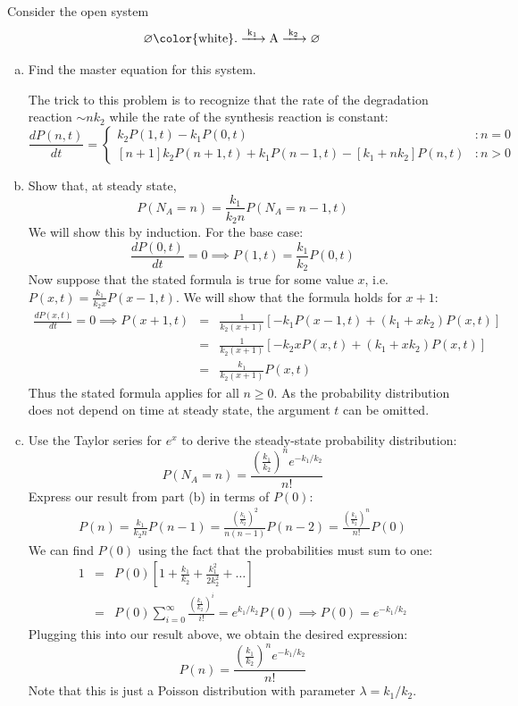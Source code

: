 \documentclass{article}
\begin{document}
Consider the open system
\[ \ce{\varnothing {\color{white} .} ->[k_1] A ->[k_2] \varnothing} \]
\begin{enumerate}[a)]
\item Find the master equation for this system.\\

{\color{red}
The trick to this problem is to recognize that the rate of the degradation reaction $\sim nk_2$ while the rate of the synthesis reaction is constant:
\[ \frac{dP(n,t)}{dt} = \left\{
     \begin{array}{lr}
       k_2 P(1,t) - k_1 P(0,t) & : n=0\\
       \left[n+1\right] k_2 P(n+1,t) + k_1 P(n-1,t) - \left[ k_1 + n k_2 \right] P(n,t) & : n>0
     \end{array}
   \right. \]

}

\item Show that, at steady state,
\[ P(N_A = n) = \frac{k_1}{k_2 n} P(N_A = n-1, t) \]
{\color{red}
We will show this by induction. For the base case:
\[ \frac{dP(0,t)}{dt} = 0 \implies P(1,t) = \frac{k_1}{k_2} P(0,t) \]
Now suppose that the stated formula is true for some value $x$, i.e. $P(x,t) = \frac{k_1}{k_2 x} P(x-1,t)$. We will show that the formula holds for $x+1$:
\begin{eqnarray*}
 \frac{dP(x,t)}{dt} = 0 \implies P(x+1,t) & = & \frac{1}{k_2(x+1)} \left[ - k_1 P(x-1,t) + \left( k_1 + x k_2 \right) P(x,t) \right]\\
 & = & \frac{1}{k_2(x+1)} \left[ - k_2 x P(x,t) + \left( k_1 + x k_2 \right) P(x,t)  \right]\\
 & = & \frac{k_1}{k_2(x+1)} P(x,t)
\end{eqnarray*}
Thus the stated formula applies for all $n \geq 0$. As the probability distribution does not depend on time at steady state, the argument $t$ can be omitted.
}

\item Use the Taylor series for $e^x$ to derive the steady-state probability distribution:
\[ P(N_A = n) = \frac{\left( \frac{k_1}{k_2} \right)^n e^{-k_1/k_2}}{n!} \]
{\color{red}
 Express our result from part (b) in terms of $P(0)$:
 \begin{eqnarray*}
P(n) = \frac{k_1}{k_2 n} P(n-1) = \frac{\left( \frac{k_1}{k_2} \right)^2}{n(n-1)} P(n-2) = \frac{\left( \frac{k_1}{k_2} \right)^n}{n!} P(0)
 \end{eqnarray*}
We can find $P(0)$ using the fact that the probabilities must sum to one:
\begin{eqnarray*}
 1 & = & P(0)\left[ 1 + \frac{k_1}{k_2} + \frac{k_1^2}{2k_2^2} + \ldots \right]\\
 & = & P(0) \sum_{i=0}^{\infty} \frac{\left( \frac{k_1}{k_2} \right)^i}{i!} = e^{k_1/k_2} P(0) \implies P(0) = e^{-k_1/k_2}
 \end{eqnarray*}
Plugging this into our result above, we obtain the desired expression:
 \[ P(n) = \frac{\left( \frac{k_1}{k_2} \right)^n e^{-k_1/k_2}}{n!} \]
 Note that this is just a Poisson distribution with parameter $\lambda=k_1/k_2$.
}


\end{enumerate}
\end{document}
